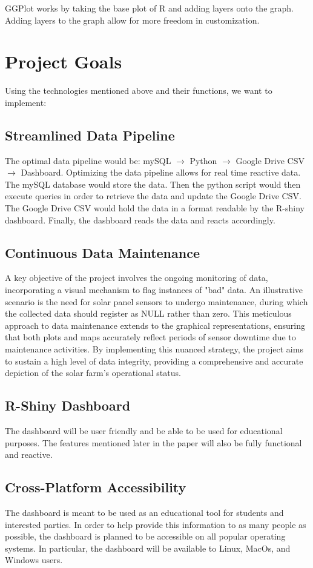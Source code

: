 \documentclass{sigchi}
\begin{document}
GGPlot works by taking the base plot of R and adding layers onto the graph. Adding layers to the graph allow for more freedom in customization. 
\section{Project Goals}
Using the technologies mentioned above and their functions, we want to implement:
\subsection{Streamlined Data Pipeline}
The optimal data pipeline would be:
mySQL $\xrightarrow{}$ Python $\xrightarrow{}$ Google Drive CSV $\xrightarrow{}$ Dashboard.
Optimizing the data pipeline allows for real time reactive data. The mySQL database would store the data. Then the python script would then execute queries in order to retrieve the data and update the Google Drive CSV. The Google Drive CSV would hold the data in a format readable by the R-shiny dashboard. Finally, the dashboard reads the data and reacts accordingly.
\subsection{Continuous Data Maintenance}
A key objective of the project involves the ongoing monitoring of data, incorporating a visual mechanism to flag instances of "bad" data. An illustrative scenario is the need for solar panel sensors to undergo maintenance, during which the collected data should register as NULL rather than zero. This meticulous approach to data maintenance extends to the graphical representations, ensuring that both plots and maps accurately reflect periods of sensor downtime due to maintenance activities. By implementing this nuanced strategy, the project aims to sustain a high level of data integrity, providing a comprehensive and accurate depiction of the solar farm's operational status.
\subsection{R-Shiny Dashboard}
The dashboard will be user friendly and be able to be used for educational purposes. The features mentioned later in the paper will also be fully functional and reactive.
\subsection{Cross-Platform Accessibility}
The dashboard is meant to be used as an educational tool for students and interested parties. In order to help provide this information to as many people as possible, the dashboard is planned to be accessible on all popular operating systems. In particular, the dashboard will be available to Linux, MacOs, and Windows users.
\end{document}
